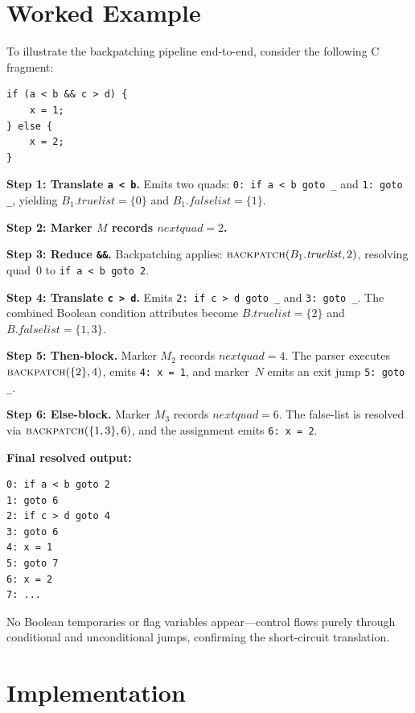 \documentclass[conference]{IEEEtran}
\begin{document}
\section{Worked Example}
\label{sec:example}

To illustrate the backpatching pipeline end-to-end, consider the following C fragment:
\begin{lstlisting}
if (a < b && c > d) {
    x = 1;
} else {
    x = 2;
}
\end{lstlisting}

\noindent\textbf{Step 1: Translate \texttt{a < b}.} Emits two quads: \texttt{0: if a < b goto \_} and \texttt{1: goto \_}, yielding $B_1.\mathit{truelist} = \{0\}$ and $B_1.\mathit{falselist} = \{1\}$.

\noindent\textbf{Step 2: Marker $M$ records $\mathit{nextquad} = 2$.}

\noindent\textbf{Step 3: Reduce \texttt{\&\&}.} Backpatching applies: $\textsc{backpatch}(B_1.\mathit{truelist}, 2)$, resolving quad~0 to \texttt{if a < b goto 2}.

\noindent\textbf{Step 4: Translate \texttt{c > d}.} Emits \texttt{2: if c > d goto \_} and \texttt{3: goto \_}. The combined Boolean condition attributes become $B.\mathit{truelist} = \{2\}$ and $B.\mathit{falselist} = \{1, 3\}$.

\noindent\textbf{Step 5: Then-block.} Marker $M_2$ records $\mathit{nextquad} = 4$. The parser executes $\textsc{backpatch}(\{2\}, 4)$, emits \texttt{4: x = 1}, and marker~$N$ emits an exit jump \texttt{5: goto \_}.

\noindent\textbf{Step 6: Else-block.} Marker $M_3$ records $\mathit{nextquad} = 6$. The false-list is resolved via $\textsc{backpatch}(\{1, 3\}, 6)$, and the assignment emits \texttt{6: x = 2}.

\noindent\textbf{Final resolved output:}
\begin{lstlisting}[style=quad]
0: if a < b goto 2
1: goto 6
2: if c > d goto 4
3: goto 6
4: x = 1
5: goto 7
6: x = 2
7: ...
\end{lstlisting}
No Boolean temporaries or flag variables appear---control flows purely through conditional and unconditional jumps, confirming the short-circuit translation.

\section{Implementation}
\label{sec:impl}
\end{document}
